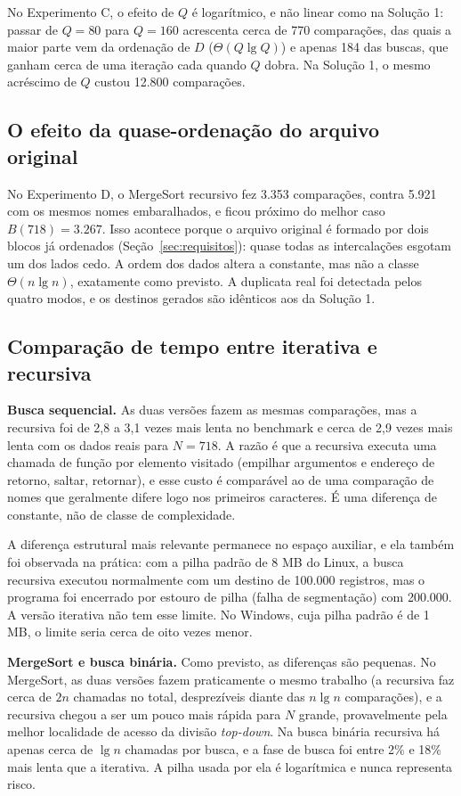 \documentclass[11pt,a4paper]{article}
\begin{document}
No Experimento C, o efeito de $Q$ é logarítmico, e não linear como na Solução 1: passar de $Q=80$ para $Q=160$ acrescenta cerca de 770 comparações, das quais a maior parte vem da ordenação de $D$ ($\Theta(Q\lg Q)$) e apenas 184 das buscas, que ganham cerca de uma iteração cada quando $Q$ dobra. Na Solução 1, o mesmo acréscimo de $Q$ custou 12.800 comparações.

\subsection{O efeito da quase-ordenação do arquivo original}
\label{sec:quaseord}

No Experimento D, o MergeSort recursivo fez 3.353 comparações, contra 5.921 com os mesmos nomes embaralhados, e ficou próximo do melhor caso $B(718)=3.267$. Isso acontece porque o arquivo original é formado por dois blocos já ordenados (Seção~\ref{sec:requisitos}): quase todas as intercalações esgotam um dos lados cedo. A ordem dos dados altera a constante, mas não a classe $\Theta(n\lg n)$, exatamente como previsto. A duplicata real foi detectada pelos quatro modos, e os destinos gerados são idênticos aos da Solução 1.

\subsection{Comparação de tempo entre iterativa e recursiva}
\label{sec:tempoiterrec}

\textbf{Busca sequencial.} As duas versões fazem as mesmas comparações, mas a recursiva foi de 2,8 a 3,1 vezes mais lenta no benchmark e cerca de 2,9 vezes mais lenta com os dados reais para $N=718$. A razão é que a recursiva executa uma chamada de função por elemento visitado (empilhar argumentos e endereço de retorno, saltar, retornar), e esse custo é comparável ao de uma comparação de nomes que geralmente difere logo nos primeiros caracteres. É uma diferença de constante, não de classe de complexidade.

A diferença estrutural mais relevante permanece no espaço auxiliar, e ela também foi observada na prática: com a pilha padrão de 8 MB do Linux, a busca recursiva executou normalmente com um destino de 100.000 registros, mas o programa foi encerrado por estouro de pilha (falha de segmentação) com 200.000. A versão iterativa não tem esse limite. No Windows, cuja pilha padrão é de 1 MB, o limite seria cerca de oito vezes menor.

\textbf{MergeSort e busca binária.} Como previsto, as diferenças são pequenas. No MergeSort, as duas versões fazem praticamente o mesmo trabalho (a recursiva faz cerca de $2n$ chamadas no total, desprezíveis diante das $n\lg n$ comparações), e a recursiva chegou a ser um pouco mais rápida para $N$ grande, provavelmente pela melhor localidade de acesso da divisão \emph{top-down}. Na busca binária recursiva há apenas cerca de $\lg n$ chamadas por busca, e a fase de busca foi entre 2\% e 18\% mais lenta que a iterativa. A pilha usada por ela é logarítmica e nunca representa risco.
\end{document}
